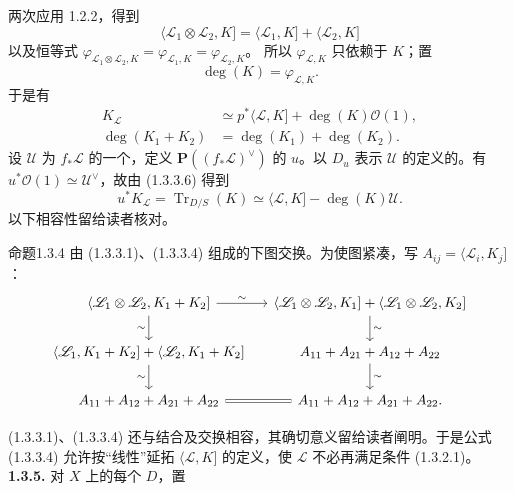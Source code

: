 两次应用 1.2.2，得到
\begin{equation}\langle\mathscr L_1\otimes\mathscr L_2,K]=\langle\mathscr L_1,K]+\langle\mathscr L_2,K]\tag{1.3.3.4}\end{equation}
以及恒等式 $\varphi_{\mathscr L_1\otimes\mathscr L_2,K}=\varphi_{\mathscr L_1,K}=\varphi_{\mathscr L_2,K}$。
所以 $\varphi_{\mathscr L,K}$ 只依赖于 $K$；置
\begin{equation}\deg(K)=\varphi_{\mathscr L,K}.\tag{1.3.3.5}\end{equation}
于是有
\begin{align}K_{\mathscr L}&\simeq p^*\langle\mathscr L,K]+\deg(K)\mathscr O(1),\tag{1.3.3.6}\\\deg(K_1+K_2)&=\deg(K_1)+\deg(K_2).\tag{1.3.3.7}\end{align}
设 $\mathscr U$ 为 $f_*\mathscr L$ 的一个，定义 $\mathbf P((f_*\mathscr L)^\vee)$ 的 $u$。以 $D_u$ 表示 $\mathscr U$ 的定义的。有 $u^*\mathscr O(1)\simeq\mathscr U^\vee$，故由 (1.3.3.6) 得到
\begin{equation}u^*K_{\mathscr L}=\operatorname{Tr}_{D/S}(K)\simeq\langle\mathscr L,K]-\deg(K)\mathscr U.\tag{1.3.3.8}\end{equation}
以下相容性留给读者核对。
\begin{SGAresult}{命题}{1.3.4}
由 (1.3.3.1)、(1.3.3.4) 组成的下图交换。为使图紧凑，写 $A_{ij}=\langle\mathscr L_i,K_j]$：
\[\begin{tikzcd}[column sep=small]\langle\mathscr L_1\otimes\mathscr L_2,K_1+K_2]\ar[r,"\sim"]\ar[d,"\sim"']&\langle\mathscr L_1\otimes\mathscr L_2,K_1]+\langle\mathscr L_1\otimes\mathscr L_2,K_2]\ar[d,"\sim"]\\\langle\mathscr L_1,K_1+K_2]+\langle\mathscr L_2,K_1+K_2]\ar[d,"\sim"']&A_{11}+A_{21}+A_{12}+A_{22}\ar[d,"\sim"]\\A_{11}+A_{12}+A_{21}+A_{22}\ar[r,equal]&A_{11}+A_{12}+A_{21}+A_{22}.\end{tikzcd}\]
\end{SGAresult}
 (1.3.3.1)、(1.3.3.4) 还与结合及交换相容，其确切意义留给读者阐明。于是公式 (1.3.3.4) 允许按“线性”延拓 $\langle\mathscr L,K]$ 的定义，使 $\mathscr L$ 不必再满足条件 (1.3.2.1)。
\textbf{1.3.5.} 对 $X$ 上的每个 $D$，置
